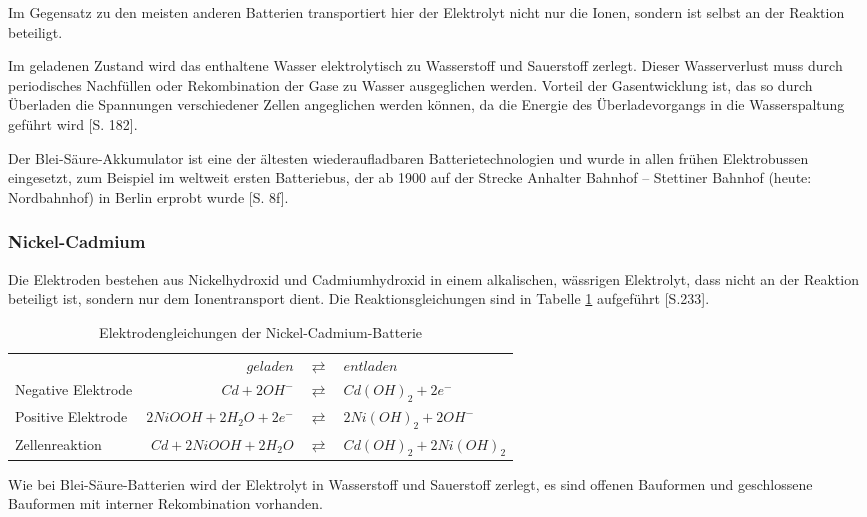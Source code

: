 Im Gegensatz zu den meisten anderen Batterien transportiert hier der Elektrolyt nicht nur die Ionen, sondern ist selbst an der Reaktion beteiligt.

Im geladenen Zustand wird das enthaltene Wasser elektrolytisch zu Wasserstoff und Sauerstoff zerlegt. Dieser Wasserverlust muss durch periodisches Nachfüllen oder Rekombination der Gase zu Wasser ausgeglichen werden. Vorteil der Gasentwicklung ist, das so durch Überladen die Spannungen verschiedener Zellen angeglichen werden können, da die Energie des Überladevorgangs in die Wasserspaltung geführt wird \cite{tub_aleph001746639}[S. 182].

Der Blei-Säure-Akkumulator ist eine der ältesten wiederaufladbaren Batterietechnologien und wurde in allen frühen Elektrobussen eingesetzt, zum Beispiel im weltweit ersten Batteriebus, der ab 1900 auf der Strecke Anhalter Bahnhof – Stettiner Bahnhof (heute: Nordbahnhof) in Berlin erprobt wurde \cite{Risch:1957}[S. 8f].

\subsubsection{Nickel-Cadmium}
Die Elektroden bestehen aus Nickelhydroxid und Cadmiumhydroxid in einem alkalischen, wässrigen Elektrolyt, dass nicht an der Reaktion beteiligt ist, sondern nur dem Ionentransport dient. Die Reaktionsgleichungen sind in Tabelle \ref{NiCd} aufgeführt \cite{Sterner:2014}[S.233].

\begin{table}\centering
  \begin{tabularx}{\linewidth}{XrcX}
  	                   &               $geladen$ & $\rightleftarrows$ & $entladen$             \\
  	Negative Elektrode &            $Cd + 2OH^-$ & $\rightleftarrows$ & $Cd(OH)_2 + 2e^-$      \\
  	Positive Elektrode & $2NiOOH + 2H_2O + 2e^-$ & $\rightleftarrows$ & $2Ni(OH)_2 + 2OH^-$    \\ \midrule
  	Zellenreaktion     &   $Cd + 2NiOOH + 2H_2O$ & $\rightleftarrows$ & $Cd(OH)_2 + 2Ni(OH)_2$ \\
  \end{tabularx}
  \caption{Elektrodengleichungen der Nickel-Cadmium-Batterie}
  \label{NiCd}
\end{table}

Wie bei Blei-Säure-Batterien wird der Elektrolyt in Wasserstoff und Sauerstoff zerlegt, es sind offenen Bauformen und geschlossene Bauformen mit interner Rekombination vorhanden.

